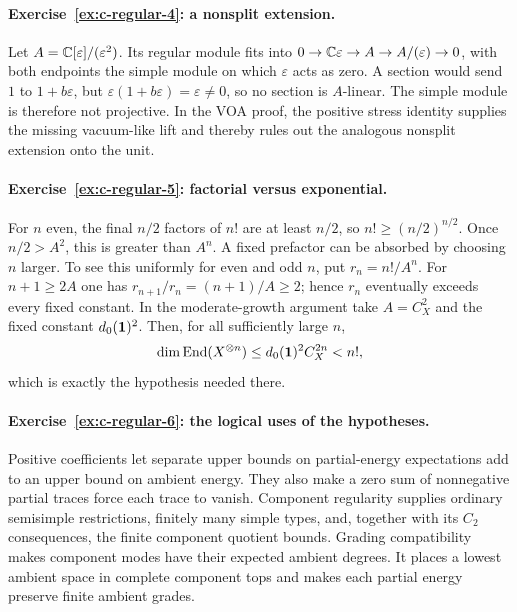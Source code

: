 \paragraph{Exercise~\ref{ex:c-regular-4}: a nonsplit extension.}
\label{sol:ex:c-regular-4}
Let $A=\mathbb C[\varepsilon]/(\varepsilon^2)$. Its regular module fits
into
$0\to\mathbb C\varepsilon\to A\to A/(\varepsilon)\to0$,
with both endpoints the simple module on which $\varepsilon$ acts
as zero. A section would send $1$ to $1+b\varepsilon$, but
$\varepsilon(1+b\varepsilon)=\varepsilon\ne0$, so no section is
$A$-linear. The simple module is therefore not projective. In the
VOA proof, the positive stress identity supplies the missing
vacuum-like lift and thereby rules out the analogous nonsplit
extension onto the unit.



\paragraph{Exercise~\ref{ex:c-regular-5}: factorial versus exponential.}
\label{sol:ex:c-regular-5}
For $n$ even, the final $n/2$ factors of $n!$ are at least $n/2$,
so $n!\geq(n/2)^{n/2}$. Once $n/2>A^2$, this is greater than
$A^n$. A fixed prefactor can be absorbed by choosing $n$ larger.
To see this uniformly for even and odd $n$, put $r_n=n!/A^n$.
For $n+1\geq2A$ one has $r_{n+1}/r_n=(n+1)/A\geq2$;
hence $r_n$ eventually exceeds every fixed constant.
In the moderate-growth argument take
$A=C_X^2$ and the fixed constant $d_0(\mathbf1)^2$. Then, for all
sufficiently large $n$,
\[
 \dim\operatorname{End}(X^{\otimes n})
 \leq d_0(\mathbf1)^2C_X^{2n}<n!,
\]
which is exactly the hypothesis needed there.



\paragraph{Exercise~\ref{ex:c-regular-6}: the logical uses of the hypotheses.}
\label{sol:ex:c-regular-6}
Positive coefficients let separate upper bounds on partial-energy
expectations add to an upper bound on ambient energy. They also
make a zero sum of nonnegative partial traces force each trace
to vanish. Component regularity supplies ordinary semisimple
restrictions, finitely many simple types, and, together with its
$C_2$ consequences, the finite component quotient bounds.
Grading compatibility makes component modes have their expected
ambient degrees. It places a lowest ambient space in complete
component tops and makes each partial energy preserve finite
ambient grades.

